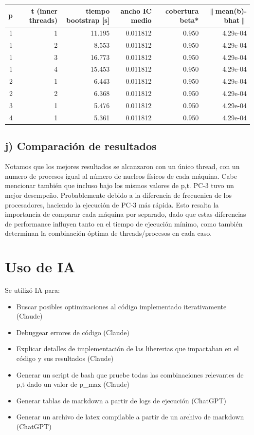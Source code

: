 \documentclass[11pt]{article}
\begin{document}
\begin{center}
\begin{tabular}{rrrrrr}
\toprule
p & t (inner threads) & tiempo bootstrap [s] & ancho IC medio & cobertura beta* & $\|$mean(b)-bhat$\|$ \\
\midrule
1 & 1 & 11.195 & 0.011812 & 0.950 & 4.29e-04 \\
1 & 2 & 8.553 & 0.011812 & 0.950 & 4.29e-04 \\
1 & 3 & 16.773 & 0.011812 & 0.950 & 4.29e-04 \\
1 & 4 & 15.453 & 0.011812 & 0.950 & 4.29e-04 \\
2 & 1 & 6.443 & 0.011812 & 0.950 & 4.29e-04 \\
2 & 2 & 6.368 & 0.011812 & 0.950 & 4.29e-04 \\
3 & 1 & 5.476 & 0.011812 & 0.950 & 4.29e-04 \\
4 & 1 & 5.361 & 0.011812 & 0.950 & 4.29e-04 \\
\bottomrule
\end{tabular}
\end{center}

\subsection*{j) Comparaci\'on de resultados}

Notamos que los mejores resultados se alcanzaron con un \'unico thread, con un numero de procesos igual al n\'umero de nucleos f\'isicos de cada m\'aquina. Cabe mencionar tambi\'en que incluso bajo los mismos valores de p,t. PC-3 tuvo un mejor desempe\~no. Probablemente debido a la diferencia de frecuenica de los procesadores, haciendo la ejecuci\'on de PC-3 m\'as r\'apida. Esto resalta la importancia de comparar cada m\'aquina por separado, dado que estas diferencias de performance influyen tanto en el tiempo de ejecuci\'on m\'inimo, como tambi\'en determinan la combinaci\'on \'optima de threads/procesos en cada caso.

\section*{Uso de IA}

Se utiliz\'o IA para:
\begin{itemize}
  \item Buscar posibles optimizaciones al c\'odigo implementado iterativamente (Claude)
  \item Debuggear errores de c\'odigo (Claude)
  \item Explicar detalles de implementaci\'on de las libererias que impactaban en el c\'odigo y sus resultados (Claude)
  \item Generar un script de bash que pruebe todas las combinaciones relevantes de p,t dado un valor de p\_max (Claude)
  \item Generar tablas de markdown a partir de logs de ejecuci\'on (ChatGPT)
  \item Generar un archivo de latex compilable a partir de un archivo de markdown (ChatGPT)
\end{itemize}
\end{document}
